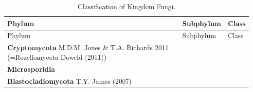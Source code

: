 \documentclass[]{book}
\begin{document}
\begin{longtable}[]{@{}lll@{}}
\caption{\label{tab:ch1tab1} Classification of Kingdom Fungi.}\tabularnewline
\toprule
\begin{minipage}[b]{0.32\columnwidth}\raggedright
Phylum\strut
\end{minipage} & \begin{minipage}[b]{0.28\columnwidth}\raggedright
Subphylum\strut
\end{minipage} & \begin{minipage}[b]{0.31\columnwidth}\raggedright
Class\strut
\end{minipage}\tabularnewline
\midrule
\endfirsthead
\toprule
\begin{minipage}[b]{0.32\columnwidth}\raggedright
Phylum\strut
\end{minipage} & \begin{minipage}[b]{0.28\columnwidth}\raggedright
Subphylum\strut
\end{minipage} & \begin{minipage}[b]{0.31\columnwidth}\raggedright
Class\strut
\end{minipage}\tabularnewline
\midrule
\endhead
\begin{minipage}[t]{0.32\columnwidth}\raggedright
\textbf{Cryptomycota} M.D.M. Jones \& T.A. Richards 2011 (=Rozellomycota Doweld (2011))\strut
\end{minipage} & \begin{minipage}[t]{0.28\columnwidth}\raggedright
\strut
\end{minipage} & \begin{minipage}[t]{0.31\columnwidth}\raggedright
\strut
\end{minipage}\tabularnewline
\begin{minipage}[t]{0.32\columnwidth}\raggedright
\textbf{Microsporidia }\strut
\end{minipage} & \begin{minipage}[t]{0.28\columnwidth}\raggedright
\strut
\end{minipage} & \begin{minipage}[t]{0.31\columnwidth}\raggedright
\strut
\end{minipage}\tabularnewline
\begin{minipage}[t]{0.32\columnwidth}\raggedright
\textbf{Blastocladiomycota} T.Y. James (2007)\strut
\end{minipage} & \begin{minipage}[t]{0.28\columnwidth}\raggedright
\strut
\end{minipage} & \begin{minipage}[t]{0.31\columnwidth}\raggedright

\end{minipage}
\end{longtable}
\end{document}
